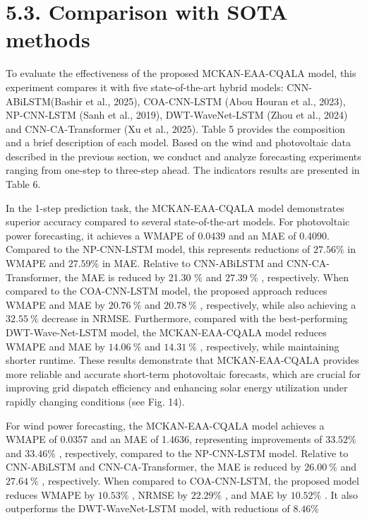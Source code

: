 \documentclass[
  10
]{article}
\begin{document}
\section{5.3. Comparison with SOTA
methods}\label{comparison-with-sota-methods}

To evaluate the effectiveness of the proposed MCKAN-EAA-CQALA model,
this experiment compares it with five state-of-the-art hybrid models:
CNN-ABiLSTM(Bashir et al., 2025), COA-CNN-LSTM (Abou Houran et al.,
2023), NP-CNN-LSTM (Sanh et al., 2019), DWT-WaveNet-LSTM (Zhou et al.,
2024) and CNN-CA-Transformer (Xu et al., 2025). Table 5 provides the
composition and a brief description of each model. Based on the wind and
photovoltaic data described in the previous section, we conduct and
analyze forecasting experiments ranging from one-step to three-step
ahead. The indicators results are presented in Table 6.

In the 1-step prediction task, the MCKAN-EAA-CQALA model demonstrates
superior accuracy compared to several state-of-the-art models. For
photovoltaic power forecasting, it achieves a WMAPE of 0.0439 and an MAE
of 0.4090. Compared to the NP-CNN-LSTM model, this represents reductions
of \(2 7 . 5 6 \%\) in WMAPE and \(2 7 . 5 9 \%\) in MAE. Relative to
CNN-ABiLSTM and CNN-CA-Transformer, the MAE is reduced by 21.30 \(\%\)
and \(2 7 . 3 9 ~ \%\) , respectively. When compared to the COA-CNN-LSTM
model, the proposed approach reduces WMAPE and MAE by \(2 0 . 7 6 ~ \%\)
and \(2 0 . 7 8 ~ \%\) , respectively, while also achieving a
\(3 2 . 5 5 ~ \%\) decrease in NRMSE. Furthermore, compared with the
best-performing DWT-Wave-Net-LSTM model, the MCKAN-EAA-CQALA model
reduces WMAPE and MAE by \(1 4 . 0 6 ~ \%\) and \(1 4 . 3 1 \ \%\) ,
respectively, while maintaining shorter runtime. These results
demonstrate that MCKAN-EAA-CQALA provides more reliable and accurate
short-term photovoltaic forecasts, which are crucial for improving grid
dispatch efficiency and enhancing solar energy utilization under rapidly
changing conditions (see Fig. 14).

For wind power forecasting, the MCKAN-EAA-CQALA model achieves a WMAPE
of 0.0357 and an MAE of 1.4636, representing improvements of
\(3 3 . 5 2 \%\) and \(3 3 . 4 6 \%\) , respectively, compared to the
NP-CNN-LSTM model. Relative to CNN-ABiLSTM and CNN-CA-Transformer, the
MAE is reduced by \(2 6 . 0 0 ~ \%\) and \(2 7 . 6 4 ~ \%\) ,
respectively. When compared to COA-CNN-LSTM, the proposed model reduces
WMAPE by \(1 0 . 5 3 \%\) , NRMSE by \(2 2 . 2 9 \%\) , and MAE by
\(1 0 . 5 2 \%\) . It also outperforms the DWT-WaveNet-LSTM model, with
reductions of \(8 . 4 6 \%\)
\end{document}
